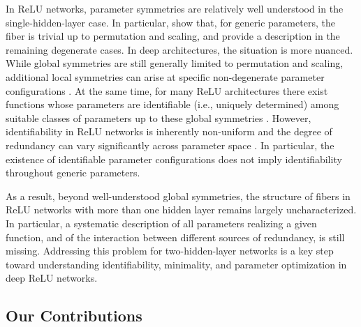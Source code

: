 \documentclass{article}
\theoremstyle{definition}
\begin{document}
In ReLU networks, parameter symmetries are relatively well understood in the single-hidden-layer case. 
In particular, \citet{PetzkaTS20} show that, for generic parameters, the fiber is trivial up to permutation and scaling, and provide a description in the remaining degenerate cases. 
%
In deep architectures, the situation is more nuanced. While global symmetries are still generally limited to permutation and scaling, additional local symmetries can arise at specific non-degenerate parameter configurations \citep{rolnick2020reverse,
grigsby2023hiddensymmetriesrelunetworks}. 
%
At the same time, for many ReLU architectures there exist functions whose parameters are identifiable (i.e., uniquely determined) among suitable classes of parameters up to these global symmetries \citep{phuong2020functional,grigsby2023hiddensymmetriesrelunetworks}.
%
However, identifiability in ReLU networks is inherently non-uniform and the degree of redundancy can vary significantly across parameter space \citep{ELISENDAGRIGSBY2025110636}. 
In particular, the existence of identifiable parameter configurations does not imply identifiability throughout generic parameters. 

As a result, beyond well-understood global symmetries, the structure of fibers in ReLU networks with more than one hidden layer remains largely uncharacterized. 
%
In particular, a systematic description of all parameters realizing a given function, and of the interaction between different sources of redundancy, is still missing. 
% 
Addressing this problem for two-hidden-layer networks is a key step toward understanding identifiability, minimality, and parameter optimization in deep ReLU networks. 


\subsection{Our Contributions}
\end{document}
